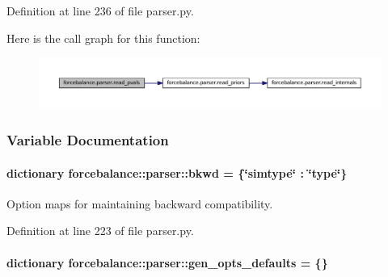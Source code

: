 \-Definition at line 236 of file parser.\-py.



\-Here is the call graph for this function\-:\nopagebreak
\begin{figure}[H]
\begin{center}
\leavevmode
\includegraphics[width=350pt]{namespaceforcebalance_1_1parser_a56fb1e139dad24bac29f25a3870765ca_cgraph}
\end{center}
\end{figure}




\subsubsection{\-Variable \-Documentation}
\hypertarget{namespaceforcebalance_1_1parser_a37193d7ceabbf07a61e65677372b7dab}{
\paragraph[{bkwd}]{\setlength{\rightskip}{0pt plus 5cm}dictionary {\bf forcebalance\-::parser\-::bkwd} = \{\char`\"{}simtype\char`\"{} \-: \char`\"{}type\char`\"{}\}}}\label{namespaceforcebalance_1_1parser_a37193d7ceabbf07a61e65677372b7dab}


\-Option maps for maintaining backward compatibility. 



\-Definition at line 223 of file parser.\-py.

\hypertarget{namespaceforcebalance_1_1parser_a807ea3a28fedbdfd494f5cc8da063202}{
\paragraph[{gen\-\_\-opts\-\_\-defaults}]{\setlength{\rightskip}{0pt plus 5cm}dictionary {\bf forcebalance\-::parser\-::gen\-\_\-opts\-\_\-defaults} = \{\}}}\label{namespaceforcebalance_1_1parser_a807ea3a28fedbdfd494f5cc8da063202}


